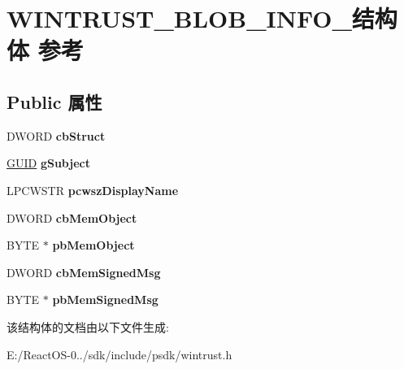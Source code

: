 \hypertarget{struct_w_i_n_t_r_u_s_t___b_l_o_b___i_n_f_o__}{}\section{W\+I\+N\+T\+R\+U\+S\+T\+\_\+\+B\+L\+O\+B\+\_\+\+I\+N\+F\+O\+\_\+结构体 参考}
\label{struct_w_i_n_t_r_u_s_t___b_l_o_b___i_n_f_o__}
\subsection*{Public 属性}
\begin{DoxyCompactItemize}
\item 
\mbox{\label{struct_w_i_n_t_r_u_s_t___b_l_o_b___i_n_f_o___a55c5bb53a77a6d57574ff7cf88fc7fee}} 
D\+W\+O\+RD {\bfseries cb\+Struct}
\item 
\mbox{\label{struct_w_i_n_t_r_u_s_t___b_l_o_b___i_n_f_o___aa37cc163b74f0e773b30773966b5abcd}} 
\hyperlink{interface_g_u_i_d}{G\+U\+ID} {\bfseries g\+Subject}
\item 
\mbox{\label{struct_w_i_n_t_r_u_s_t___b_l_o_b___i_n_f_o___a6db46f257a1fe0ad685d768113d916f7}} 
L\+P\+C\+W\+S\+TR {\bfseries pcwsz\+Display\+Name}
\item 
\mbox{\label{struct_w_i_n_t_r_u_s_t___b_l_o_b___i_n_f_o___a4c7b23d34c321ded21194fde72cf096f}} 
D\+W\+O\+RD {\bfseries cb\+Mem\+Object}
\item 
\mbox{\label{struct_w_i_n_t_r_u_s_t___b_l_o_b___i_n_f_o___a793256afbe38a166ea36d0b21d2c8a6a}} 
B\+Y\+TE $\ast$ {\bfseries pb\+Mem\+Object}
\item 
\mbox{\label{struct_w_i_n_t_r_u_s_t___b_l_o_b___i_n_f_o___ab10b0e72a8fd7161fa5d2c30fdabb3b4}} 
D\+W\+O\+RD {\bfseries cb\+Mem\+Signed\+Msg}
\item 
\mbox{\label{struct_w_i_n_t_r_u_s_t___b_l_o_b___i_n_f_o___a0c494d43e873f00f39f31a7b01ea671d}} 
B\+Y\+TE $\ast$ {\bfseries pb\+Mem\+Signed\+Msg}
\end{DoxyCompactItemize}


该结构体的文档由以下文件生成\+:\begin{DoxyCompactItemize}
\item 
E\+:/\+React\+O\+S-\/0../sdk/include/psdk/wintrust.\+h\end{DoxyCompactItemize}
